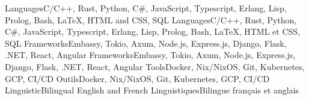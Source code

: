     \resumeEnumerationStart
        \resumeEnumerationEnFr
            {Languages}{C/C++, Rust, Python, C\#, JavaScript, Typescript, Erlang, Lisp, Prolog, Bash, LaTeX, HTML and CSS, SQL}
            {Languages}{C/C++, Rust, Python, C\#, JavaScript, Typescript, Erlang, Lisp, Prolog, Bash, LaTeX, HTML et CSS, SQL}
        \resumeEnumerationEnFr
            {Frameworks}{Embassy, Tokio, Axum, Node.js, Express.js, Django, Flask, .NET, React, Angular}
            {Frameworks}{Embassy, Tokio, Axum, Node.js, Express.js, Django, Flask, .NET, React, Angular}
        \resumeEnumerationEnFr
            {Tools}{Docker, Nix/NixOS, Git, Kubernetes, GCP, CI/CD}
            {Outils}{Docker, Nix/NixOS, Git, Kubernetes, GCP, CI/CD}
        \resumeEnumerationEnFr
            {Linguistic}{Bilingual English and French}
            {Linguistiques}{Bilingue français et anglais}
    \resumeEnumerationEnd


